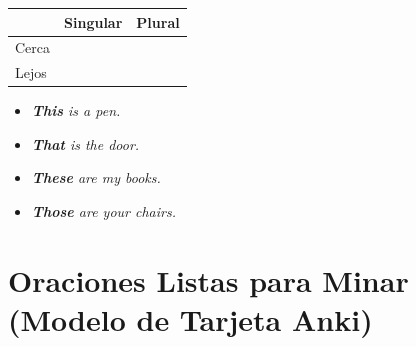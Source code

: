 \documentclass[12pt,a4paper]{article}
\begin{document}
\begin{cajagrammar}
\begin{tabularx}{\textwidth}{@{} l l X @{}}
\toprule
 & \textbf{Singular} & \textbf{Plural} \\
\midrule
Cerca & \eng{this} \esp{este/esta} & \eng{these} \esp{estos/estas} \\
Lejos & \eng{that} \esp{ese/aquel} & \eng{those} \esp{esos/aquellos} \\
\bottomrule
\end{tabularx}

\medskip
\begin{cajaejemplo}
\begin{itemize}[nosep, leftmargin=0.8cm]
  \item \textit{\textbf{This} is a pen.} 
  \item \textit{\textbf{That} is the door.} 
  \item \textit{\textbf{These} are my books.} 
  \item \textit{\textbf{Those} are your chairs.} 
\end{itemize}
\end{cajaejemplo}
\end{cajagrammar}

\section{Oraciones Listas para Minar (Modelo de Tarjeta Anki)}
\end{document}
